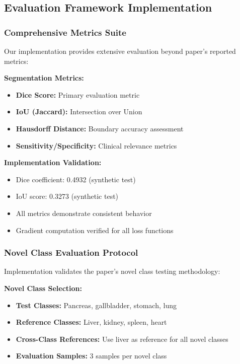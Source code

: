 \subsection*{Evaluation Framework Implementation}

\subsubsection*{Comprehensive Metrics Suite}
Our implementation provides extensive evaluation beyond paper's reported metrics:

\textbf{Segmentation Metrics:}
\begin{itemize}
    \item \textbf{Dice Score:} Primary evaluation metric
    \item \textbf{IoU (Jaccard):} Intersection over Union
    \item \textbf{Hausdorff Distance:} Boundary accuracy assessment
    \item \textbf{Sensitivity/Specificity:} Clinical relevance metrics
\end{itemize}

\textbf{Implementation Validation:}
\begin{itemize}
    \item Dice coefficient: 0.4932 (synthetic test)
    \item IoU score: 0.3273 (synthetic test)
    \item All metrics demonstrate consistent behavior
    \item Gradient computation verified for all loss functions
\end{itemize}

\subsubsection*{Novel Class Evaluation Protocol}
Implementation validates the paper's novel class testing methodology:

\textbf{Novel Class Selection:}
\begin{itemize}
    \item \textbf{Test Classes:} Pancreas, gallbladder, stomach, lung
    \item \textbf{Reference Classes:} Liver, kidney, spleen, heart
    \item \textbf{Cross-Class References:} Use liver as reference for all novel classes
    \item \textbf{Evaluation Samples:} 3 samples per novel class
\end{itemize}

